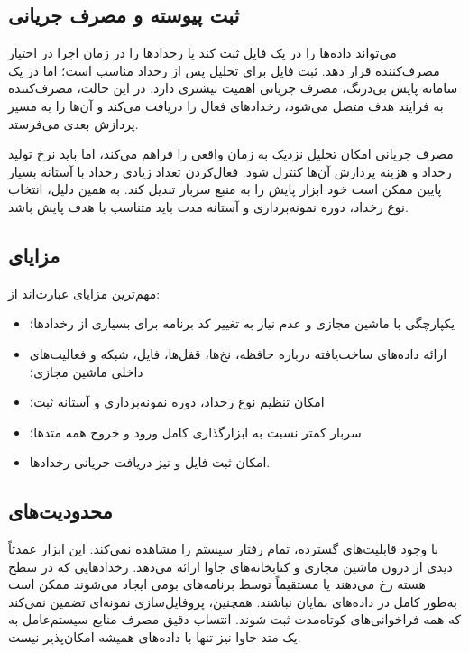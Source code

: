 \subsection{ثبت پیوسته و مصرف جریانی}

 می‌تواند داده‌ها را در یک فایل ثبت کند یا رخدادها را در زمان اجرا در
اختیار مصرف‌کننده قرار دهد. ثبت فایل برای تحلیل پس از رخداد مناسب است؛ اما در
یک سامانه پایش بی‌درنگ، مصرف جریانی اهمیت بیشتری دارد. در این حالت، مصرف‌کننده
به فرایند هدف متصل می‌شود، رخدادهای فعال را دریافت می‌کند و آن‌ها را به مسیر
پردازش بعدی می‌فرستد.

مصرف جریانی امکان تحلیل نزدیک به زمان واقعی را فراهم می‌کند، اما باید نرخ تولید
رخداد و هزینه پردازش آن‌ها کنترل شود. فعال‌کردن تعداد زیادی رخداد با آستانه بسیار
پایین ممکن است خود ابزار پایش را به منبع سربار تبدیل کند. به همین دلیل، انتخاب
نوع رخداد، دوره نمونه‌برداری و آستانه مدت باید متناسب با هدف پایش باشد.

\subsection{مزایای }

مهم‌ترین مزایای  عبارت‌اند از:

\begin{itemize}
    \item یکپارچگی با ماشین مجازی و عدم نیاز به تغییر کد برنامه برای بسیاری از
    رخدادها؛
    \item ارائه داده‌های ساخت‌یافته درباره حافظه، نخ‌ها، قفل‌ها، فایل، شبکه و
    فعالیت‌های داخلی ماشین مجازی؛
    \item امکان تنظیم نوع رخداد، دوره نمونه‌برداری و آستانه ثبت؛
    \item سربار کمتر نسبت به ابزارگذاری کامل ورود و خروج همه متدها؛
    \item امکان ثبت فایل و نیز دریافت جریانی رخدادها.
\end{itemize}

\subsection{محدودیت‌های }

با وجود قابلیت‌های گسترده،  تمام رفتار سیستم را مشاهده نمی‌کند. این
ابزار عمدتاً دیدی از درون ماشین مجازی و کتابخانه‌های جاوا ارائه می‌دهد. رخدادهایی
که در سطح هسته رخ می‌دهند یا مستقیماً توسط برنامه‌های بومی ایجاد می‌شوند ممکن
است به‌طور کامل در داده‌های  نمایان نباشند. همچنین، پروفایل‌سازی
نمونه‌ای تضمین نمی‌کند که همه فراخوانی‌های کوتاه‌مدت ثبت شوند. انتساب دقیق مصرف
منابع سیستم‌عامل به یک متد جاوا نیز تنها با داده‌های  همیشه امکان‌پذیر
نیست.

